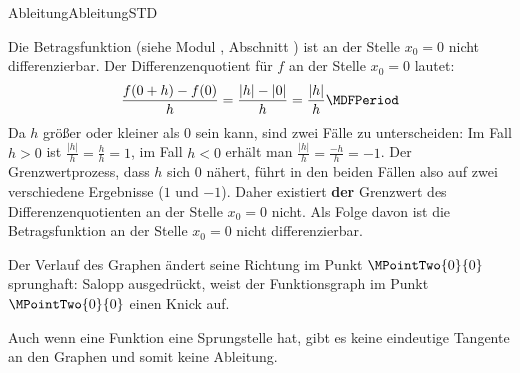 \begin{MXContent}{Ableitung}{Ableitung}{STD}
\begin{MExample}
Die Betragsfunktion (siehe Modul , Abschnitt ) ist an der Stelle $x_0 = 0$ nicht differenzierbar.
Der Differenzenquotient für $f$ an der Stelle $x_0 = 0$ lautet:
\[
\frac{f(0+h) - f(0)}{h} = \frac{|h| - |0|}{h} = \frac{|h|}{h} \MDFPeriod
\]
Da $h$ größer oder kleiner als $0$ sein kann, sind zwei Fälle zu unterscheiden:
Im Fall $h > 0$ ist $\frac{|h|}{h} = \frac{h}{h} = 1$, im Fall $h < 0$ erhält man $\frac{|h|}{h} = \frac{-h}{h} = -1$.
Der Grenzwertprozess, dass $h$ sich $0$ nähert, führt in den beiden Fällen also auf zwei verschiedene Ergebnisse ($1$ und $-1$).
Daher existiert \textbf{der} Grenzwert des Differenzenquotienten an der Stelle $x_0 = 0$ nicht. Als Folge davon ist die Betragsfunktion an der Stelle $x_0 = 0$ nicht differenzierbar.

Der Verlauf des Graphen ändert seine Richtung im Punkt $\MPointTwo{0}{0}$ sprunghaft: Salopp ausgedrückt, weist der Funktionsgraph im Punkt $\MPointTwo{0}{0}$ einen Knick auf.
\begin{center}
\end{center}
\end{MExample}

Auch wenn eine Funktion eine Sprungstelle hat, gibt es keine eindeutige Tangente an den Graphen und somit keine Ableitung.

\end{MXContent}

